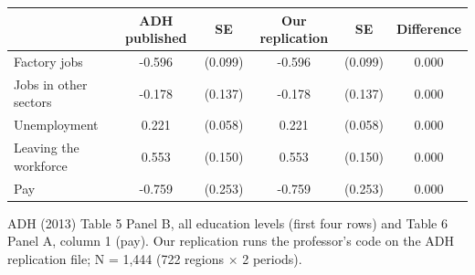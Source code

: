 \begin{tabular}{lccccc}
\toprule
 & ADH published & SE & Our replication & SE & Difference \\
\midrule
Factory jobs & -0.596 & (0.099) & -0.596 & (0.099) & 0.000 \\
Jobs in other sectors & -0.178 & (0.137) & -0.178 & (0.137) & 0.000 \\
Unemployment & 0.221 & (0.058) & 0.221 & (0.058) & 0.000 \\
Leaving the workforce & 0.553 & (0.150) & 0.553 & (0.150) & 0.000 \\
Pay & -0.759 & (0.253) & -0.759 & (0.253) & 0.000 \\
\bottomrule
\end{tabular}

{\tiny ADH (2013) Table 5 Panel B, all education levels (first four rows) and Table 6 Panel A, column 1 (pay). Our replication runs the professor's code on the ADH replication file; N = 1,444 (722 regions $\times$ 2 periods).}
